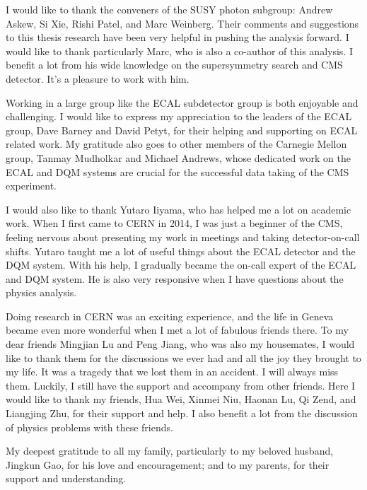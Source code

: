 \documentclass[12pt,twoside]{memoir}
\begin{document}
I would like to thank the conveners of the SUSY photon subgroup: Andrew Askew, Si Xie, Rishi Patel, and Marc Weinberg. Their comments and suggestions to this thesis research have been very helpful in pushing the analysis forward. I would like to thank particularly Marc, who is also a co-author of this analysis. I benefit a lot from his wide knowledge on the supersymmetry search and CMS detector. It's a pleasure to work with him.  

Working in a large group like the ECAL subdetector group is both enjoyable and challenging. I would like to express my appreciation to the leaders of the ECAL group, Dave Barney and David Petyt, for their helping and supporting on ECAL related work. My gratitude also goes to other members of the Carnegie Mellon group, Tanmay Mudholkar and Michael Andrews, whose dedicated work on the ECAL and DQM systems are crucial for the successful data taking of the CMS experiment.  

I would also like to thank Yutaro Iiyama, who has helped me a lot on academic work. When I first came to CERN in 2014, I was just a beginner of the CMS, feeling nervous about presenting my work in meetings and taking detector-on-call shifts. Yutaro taught me a lot of useful things about the ECAL detector and the DQM system. With his help, I gradually became the on-call expert of the ECAL and DQM system. He is also very responsive when I have questions about the physics analysis. 

Doing research in CERN was an exciting experience, and the life in Geneva became even more wonderful when I met a lot of fabulous friends there. 
To my dear friends Mingjian Lu and Peng Jiang, who was also my housemates, I would like to thank them for the discussions we ever had and all the joy they brought to my life. 
It was a tragedy that we lost them in an accident. I will always miss them. 
Luckily, I still have the support and accompany from other friends. 
Here I would like to thank my friends, Hua Wei, Xinmei Niu, Haonan Lu, Qi Zend, and Liangjing Zhu, for their support and help. 
I also benefit a lot from the discussion of physics problems with these friends. 

My deepest gratitude to all my family, particularly to my beloved husband, Jingkun Gao, for his love and encouragement; and to my parents, for their support and understanding.  


\newpage
\tableofcontents
\listoftables
\listoffigures

\clearpage 
\end{document}
